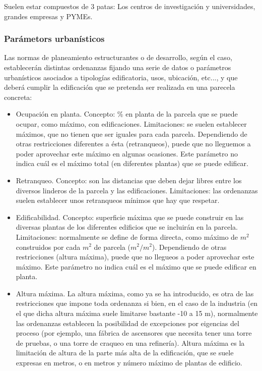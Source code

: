 Suelen estar compuestos de 3 patas: Los centros de investigación y universidades, grandes empresas y PYMEs.

\subsubsection{Parámetors urbanísticos}
Las normas de planeamiento estructurantes o de desarrollo, según el caso, establecerán distintas ordenanzas fijando una serie de datos o parámetros urbanísticos asociados a tipologías edificatoria, usos, ubicación, etc..., y que deberá cumplir la edificación que se pretenda ser realizada en una parecela concreta:
\begin{itemize}
    \item Ocupación en planta.
    Concepto: \% en planta de la parcela que se puede ocupar, como máximo, con edificaciones.
    Limitaciones: se suelen establecer máximos, que no tienen que ser iguales para cada parcela.
    Dependiendo de otras restricciones diferentes a ésta (retranqueos), puede que no lleguemos a poder aprovechar este máximo en algunas ocasiones.
    Este parámetro no indica cuál es el máximo total (en diferentes plantas) que se puede edificar.
    \item Retranqueo.
    Concepto: son las distancias que deben dejar libres entre los diversos linderos de la parcela y las edificaciones.
    Limitaciones: las ordenanzas suelen establecer unos retranqueos mínimos que hay que respetar.
    \item Edificabilidad.
    Concepto: superficie máxima que se puede construir en las diversas plantas de los diferentes edificios que se incluirán en la parcela.
    Limitaciones: normalmente se define de forma directa, como máximo de $m^2$ construidos por cada $m^2$ de parcela ($m^2 / m^2$).
    Dependiendo de otras restricciones (altura máxima), puede que no llegueos a poder aprovechar este máximo.
    Este parámetro no indica cuál es el máximo que se puede edificar en planta.
    \item Altura máxima.
    La altura máxima, como ya se ha introducido, es otra de las restricciones que impone toda ordenanza si bien, en el caso de la industria (en el que dicha altura máxima suele limitarse bastante -10 a 15 m), normalmente las ordenanzas establecen la posibilidad de excepciones por eigencias del proceso (por ejemplo, una fábrica de ascensores que necesita tener una torre de pruebas, o una torre de craqueo en una refinería).
    Altura máxima es la limitación de altura de la parte más alta de la edificación, que se suele expresas en metros, o en metros y número máximo de plantas de edificio.
\end{itemize}

